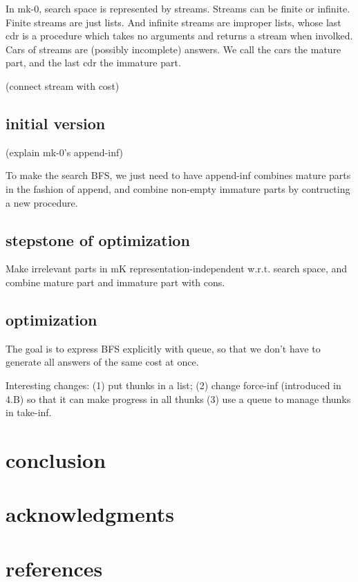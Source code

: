\documentclass[format=acmlarge, review=true, authordraft=true]{acmart}
\begin{document}
In mk-0, search space is represented by streams. Streams can be finite or infinite. Finite streams are just lists. And infinite streams are improper lists, whose last cdr is a procedure which takes no arguments and returns a stream when involked. Cars of streams are (possibly incomplete) answers. We call the cars the mature part, and the last cdr the immature part.

(connect stream with cost)

\subsection{initial version}

(explain mk-0's append-inf)



To make the search BFS, we just need to have append-inf combines mature parts in the fashion of append, and combine non-empty immature parts by contructing a new procedure.



\subsection{stepstone of optimization}

Make irrelevant parts in mK representation-independent w.r.t. search space, and combine mature part and immature part with cons.

\subsection{optimization}

The goal is to express BFS explicitly with queue, so that we don’t have to generate all answers of the same cost at once.

Interesting changes: (1) put thunks in a list; (2) change force-inf (introduced in 4.B) so that it can make progress in all thunks (3) use a queue to manage thunks in take-inf.

\section{conclusion}

\section*{acknowledgments}

\section*{references}
\end{document}
